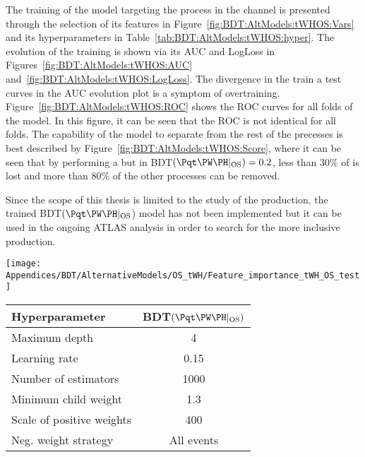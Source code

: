 The training of the model targeting the \tWH process in the \dilepOStau channel is presented through the 
selection of its features in Figure~\ref{fig:BDT:AltModels:tWHOS:Vars} and its hyperparameters
in Table~\ref{tab:BDT:AltModels:tWHOS:hyper}. The evolution of the training is shown via
its AUC and LogLoss in Figures~\ref{fig:BDT:AltModels:tWHOS:AUC} and~\ref{fig:BDT:AltModels:tWHOS:LogLoss}.
The divergence in the train a test curves in the AUC evolution plot is a symptom of overtraining. 
Figure~\ref{fig:BDT:AltModels:tWHOS:ROC} shows the ROC curves for all folds of the model.
In this figure, it can be seen that the ROC is not identical for all folds. 
The capability of the model to separate \tWH from the rest of the precesses is best described by
Figure~\ref{fig:BDT:AltModels:tWHOS:Score}, where it can be seen that by performing a but
in BDT$(\tWH|_{\text{OS}})=0.2$, less than 30\% of \tWH is lost and more than 80\% of
the other processes can be removed. 

Since the scope of this thesis is limited to the study of the \tHq production, the trained BDT$(\tWH|_{\text{OS}}$)
model has not been implemented but it can be used in the ongoing ATLAS analysis in order to search
for the more inclusive \tH production. 

    \begin{minipage}{0.55\textwidth}
        \centering
        \texttt{[image: Appendices/BDT/AlternativeModels/OS\_tWH/Feature\_importance\_tWH\_OS\_test]} 
        \label{fig:BDT:AltModels:tWHOS:Vars}
    \end{minipage}
    \hfill
    \begin{minipage}{0.4\textwidth}
	\centering
	\begin{adjustbox}{max width=0.99\textwidth}
		\begin{tabular}{l|c}
		\toprule
		Hyperparameter            	& BDT$(\tWH|_{\text{OS}})$ \\ \midrule
		Maximum depth             	& 4                        \\
		Learning rate             	& 0.15                   \\
		Number of estimators      	& 1000                     \\
		Minimum child weight       	& 1.3                     \\
		Scale of positive weights 	& 400                  \\
		Neg. weight strategy      	& All events           \\ \bottomrule
		\end{tabular}
	\end{adjustbox}
	\label{tab:BDT:AltModels:tWHOS:hyper}
    \end{minipage}

